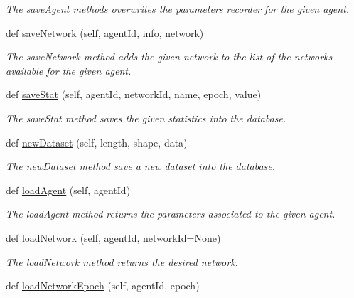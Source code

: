 \begin{DoxyCompactItemize}
\begin{DoxyCompactList}\small\item\em The save\+Agent methods overwrites the parameters recorder for the given agent. \end{DoxyCompactList}\item 
def \hyperlink{classDQN-Deepmind-NIPS-2013_1_1Saver_1_1Saver_aebf1fa14b77298919410191ecbab6fe5}{save\+Network} (self, agent\+Id, info, network)
\begin{DoxyCompactList}\small\item\em The save\+Network method adds the given network to the list of the networks available for the given agent. \end{DoxyCompactList}\item 
def \hyperlink{classDQN-Deepmind-NIPS-2013_1_1Saver_1_1Saver_ae1370bef68104eb715e1387d69bb7cf1}{save\+Stat} (self, agent\+Id, network\+Id, name, epoch, value)
\begin{DoxyCompactList}\small\item\em The save\+Stat method saves the given statistics into the database. \end{DoxyCompactList}\item 
def \hyperlink{classDQN-Deepmind-NIPS-2013_1_1Saver_1_1Saver_a5c4872622dfd891849a22e447ec7d902}{new\+Dataset} (self, length, shape, data)
\begin{DoxyCompactList}\small\item\em The new\+Dataset method save a new dataset into the database. \end{DoxyCompactList}\item 
def \hyperlink{classDQN-Deepmind-NIPS-2013_1_1Saver_1_1Saver_aaf903c7b667b1909a17beb60c13f2398}{load\+Agent} (self, agent\+Id)
\begin{DoxyCompactList}\small\item\em The load\+Agent method returns the parameters associated to the given agent. \end{DoxyCompactList}\item 
def \hyperlink{classDQN-Deepmind-NIPS-2013_1_1Saver_1_1Saver_a90f2e74db8a2b69b94959945ffb896f6}{load\+Network} (self, agent\+Id, network\+Id=None)
\begin{DoxyCompactList}\small\item\em The load\+Network method returns the desired network. \end{DoxyCompactList}\item 
def \hyperlink{classDQN-Deepmind-NIPS-2013_1_1Saver_1_1Saver_aad377d9e28499a19a591d080e6a0df63}{load\+Network\+Epoch} (self, agent\+Id, epoch)

\end{DoxyCompactItemize}
